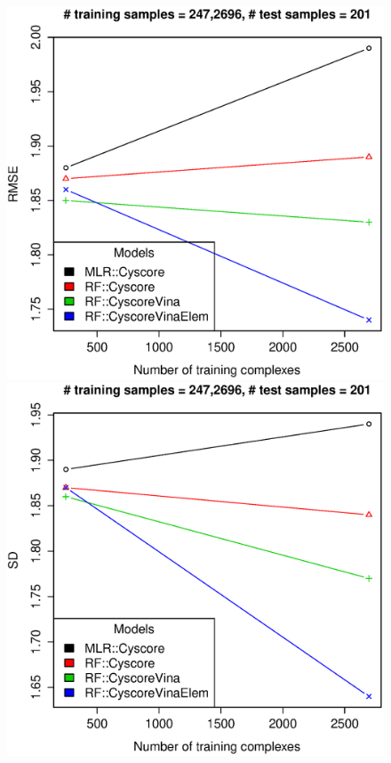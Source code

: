 \documentclass[journal=jacsat,manuscript=article]{achemso}
\begin{document}
\begin{figure}[ht!]
\endminipage
\\
\includegraphics[width=\linewidth]{../rfcyscore/tst-201-rmse.eps}
\endminipage
{}
\includegraphics[width=\linewidth]{../rfcyscore/tst-201-sdev.eps}

\end{figure}
\end{document}
